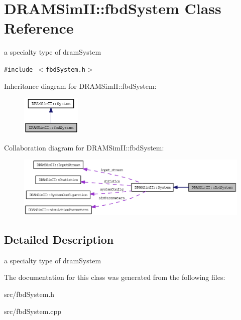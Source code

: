 \section{DRAMSimII::fbdSystem Class Reference}
\label{class_d_r_a_m_sim_i_i_1_1fbd_system}
a specialty type of dramSystem  


{\tt \#include $<$fbdSystem.h$>$}

Inheritance diagram for DRAMSimII::fbdSystem:\nopagebreak
\begin{figure}[H]
\begin{center}
\leavevmode
\includegraphics[width=81pt]{class_d_r_a_m_sim_i_i_1_1fbd_system__inherit__graph}
\end{center}
\end{figure}
Collaboration diagram for DRAMSimII::fbdSystem:\nopagebreak
\begin{figure}[H]
\begin{center}
\leavevmode
\includegraphics[width=400pt]{class_d_r_a_m_sim_i_i_1_1fbd_system__coll__graph}
\end{center}
\end{figure}


\subsection{Detailed Description}
a specialty type of dramSystem 

The documentation for this class was generated from the following files:\begin{CompactItemize}
\item 
src/fbdSystem.h\item 
src/fbdSystem.cpp\end{CompactItemize}
